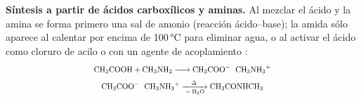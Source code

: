 \textbf{Síntesis a partir de ácidos carboxílicos y aminas.} Al mezclar el
ácido y la amina se forma primero una sal de amonio (reacción ácido--base);
la amida sólo aparece al calentar por encima de 100\,\si{\degreeCelsius}
para eliminar agua, o al activar el ácido como cloruro de acilo o con un
agente de acoplamiento \cite{clayden2012}:
\begin{gather}
	\reac{CH3COOH + CH3NH2 -> CH3COO- \; CH3NH3+}\\
	\reac{CH3COO- \; CH3NH3+ ->[\Delta][- H2O] CH3CONHCH3}
\end{gather}
